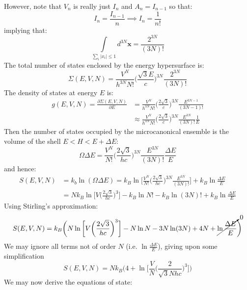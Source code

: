 \documentclass[a4paper,11pt,oneside]{book}
\begin{document}
However, note that $V_n$ is really just $I_{n}$ and $A_n = I_{n-1}$ so that:
\begin{equation}
    I_n = \frac{I_{n-1}}{n} \implies I_n = \frac{1}{n!}
\end{equation}
implying that:
\begin{equation}
    \int \limits_{\sum_i |x_i|\leq 1} d^{3N}\textbf{x} = \frac{2^{3N}}{(3N)!}
\end{equation}
The total number of states enclosed by the energy hypersurface is:
\begin{equation}
    \Sigma(E,V,N) = \frac{V^N}{h^{3N} N!} \bigg(\frac{\sqrt{3}E}{c}\bigg)^{3N} \frac{2^{3N}}{(3N)!}
\end{equation}
The density of states at energy $E$ is:
\begin{align}
    g(E,V,N) = \frac{\partial \Sigma(E,V,N)}{\partial E} &= \frac{V^N}{h^{3N} N!} \bigg(\frac{2\sqrt{3}}{c}\bigg)^{3N} \frac{E^{3N-1}}{(3N-1)!}\\
    &\approx\frac{V^N}{h^{3N} N!} \bigg(\frac{2\sqrt{3}}{c}\bigg)^{3N} \frac{E^{3N}}{(3N)!}\frac{1}{E}
\end{align}
Then the number of states occupied by the microcanonical ensemble is the volume of the shell $E<H<E+\Delta E$:
\begin{equation}
  \Omega \Delta E = \frac{V^N}{N!} \bigg(\frac{2\sqrt{3}}{hc}\bigg)^{3N} \frac{E^{3N}}{(3N)!}\frac{\Delta E}{E}
\end{equation}
and hence:
\begin{align}
    S(E,V,N) &= k_b \ln (\Omega \Delta E)  = k_B \ln \bigg[\frac{V^N}{N!} \bigg(\frac{2\sqrt{3}}{hc}\bigg)^{3N} \frac{E^{3N}}{(3N)!}\bigg]+k_B \ln \frac{\Delta E}{E}\\
    &=N k_B \ln \bigg[V\bigg(\frac{2\sqrt{3}}{hc}\bigg)^{3}\bigg] - k_B \ln N! - k_B \ln (3N)!+k_B\ln \frac{\Delta E}{E}
\end{align}
Using Stirling's approximation:
\begin{equation}
    S(E,V,N) =k_B\bigg(N \ln \bigg[V\bigg(\frac{2\sqrt{3}}{hc}\bigg)^{3}\bigg] - N \ln N - 3N \ln (3N) + 4N+\cancelto{0}{\ln \frac{\Delta E}{E}}\bigg)
\end{equation}
We may ignore all terms not of order $N$ (i.e. $\ln \frac{\Delta E}{E}$), giving upon some simplification
\begin{equation}
    \boxed{S(E,V,N) = Nk_B\Bigg(4+ \ln \Bigg[\frac{V}{N}\bigg(\frac{2}{\sqrt{3} Nhc}\bigg)^{3}\Bigg]\Bigg)}
\end{equation}
We may now derive the equations of state:
\end{document}
